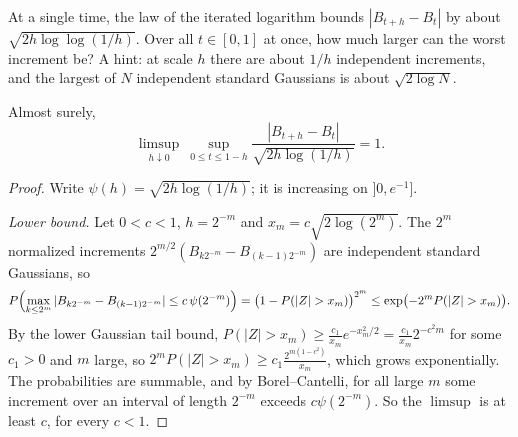 \begin{think}
At a single time, the law of the iterated logarithm bounds $|B_{t+h}-B_t|$ by about $\sqrt{2h\log\log(1/h)}$. Over all $t\in[0,1]$ at once, how much larger can the worst increment be? A
hint: at scale $h$ there are about $1/h$ independent increments, and the largest of $N$ independent standard Gaussians is about $\sqrt{2\log N}$.
\end{think}

\begin{theorem}[L\'evy, 1937]\label{thm:levymodulus}
Almost surely,
\[
\limsup_{h\downarrow0}\ \sup_{0\le t\le1-h}\frac{|B_{t+h}-B_t|}{\sqrt{2h\log(1/h)}}=1 .
\]
\end{theorem}

\begin{proof}
Write $\psi(h)=\sqrt{2h\log(1/h)}$; it is increasing on $]0,e^{-1}]$.

\emph{Lower bound.} Let $0<c<1$, $h=2^{-m}$ and $x_m=c\sqrt{2\log(2^m)}$. The $2^m$ normalized increments $2^{m/2}(B_{k2^{-m}}-B_{(k-1)2^{-m}})$ are independent standard Gaussians, so
\[
P\Bigl(\max_{k\le2^m}|B_{k2^{-m}}-B_{(k-1)2^{-m}}|\le c\,\psi(2^{-m})\Bigr)=\bigl(1-P(|Z|>x_m)\bigr)^{2^m}\le\exp\bigl(-2^mP(|Z|>x_m)\bigr).
\]
By the lower Gaussian tail bound, $P(|Z|>x_m)\ge\frac{c_1}{x_m}e^{-x_m^2/2}=\frac{c_1}{x_m}2^{-c^2m}$ for some $c_1>0$ and $m$ large, so $2^mP(|Z|>x_m)\ge c_1\frac{2^{m(1-c^2)}}{x_m}$, which grows exponentially. The
probabilities are summable, and by Borel--Cantelli, for all large $m$ some increment over an interval of length $2^{-m}$ exceeds $c\psi(2^{-m})$. So the $\limsup$ is at least $c$, for every $c<1$.


\end{proof}
